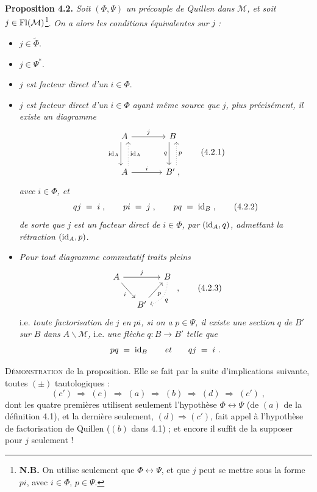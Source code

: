 \textbf{Proposition 4.2.} \textit{Soit} $(\Phi,\Psi)$ \textit{un précouple de Quillen dans} $\mathcal{M}$\textit{, et soit} $j\in\mathrm{Fl}(\mathcal{M})$\footnote[9]{\textbf{N.B.} On utilise seulement que $\Phi\longleftrightarrow\Psi$, et que $j$ peut se mettre sous la forme $pi$, avec $i\in\Phi$, $p\in\Psi$.}. %
\textit{On a alors les conditions équivalentes sur} $j$ \textit{:}
\begin{itemize}[leftmargin=2.5em]
\item[a)] $j\in\widetilde{\Phi}$.
\item[b)] $j\in\Psi^*$.
\item[c)] $j$ \textit{est facteur direct d'un} $i\in\Phi$.
\item[c$'$)] $j$ \textit{est facteur direct d'un} $i\in\Phi$ \textit{ayant même source que} $j$\textit{, plus précisément, il existe un diagramme}
\[
\begin{tikzcd}[row sep=large, column sep=large]
A \arrow[r, "j"] \arrow[d, shift right=1ex, "\id_A"'] & B \arrow[d, shift right=1ex, "q"'] \\
A \arrow[u, dotted, shift right=1ex, "\id_A"'] \arrow[r, "i"] & B' \;, \arrow[u, dotted, shift right=1ex, "p"']
\end{tikzcd}
\tag*{(4.2.1)}
\]
\textit{avec} $i\in\Phi$\textit{, et}
\[
qj \;=\; i\;, \qquad pi \;=\; j\;, \qquad pq \;=\; \mathrm{id}_B\;,
\tag*{(4.2.2)}
\]
\textit{de sorte que} $j$ \textit{est un facteur direct de} $i\in\Phi$\textit{, par} $(\mathrm{id}_A,q)$\textit{, admettant la rétraction} $(\mathrm{id}_A,p)$.
\item[d)] \textit{Pour tout diagramme commutatif traits pleins}
\[
\begin{tikzcd}[column sep=small]
A \arrow[rr, "j"] \arrow[dr, "i"'] & & B \arrow[dl, dotted, bend left=40, "q"] \\
& B' \arrow[ur, "p"'] &
\end{tikzcd}
\;,
\tag*{(4.2.3)}
\]
i.e. \textit{toute factorisation de} $j$ \textit{en} $pi$\textit{, si on a} $p\in\Psi$\textit{, il existe une section} $q$ \textit{de} $B'$ \textit{sur} $B$ \textit{dans} $A\backslash\mathcal{M}$\textit{,} i.e. \textit{une flèche} $q:B\longrightarrow B'$ \textit{telle que}
\[
pq \;=\; \mathrm{id}_B \qquad \textit{et} \qquad qj \;=\; i\ .
\]
\end{itemize}

\textsc{Démonstration} de la proposition. Elle se fait par la suite d'implications suivante, toutes $(\pm)$ tautologiques :
\[
(c') \;\Longrightarrow\; (c) \;\Longrightarrow\; (a) \;\Longrightarrow\; (b) \;\Longrightarrow\; (d) \;\Longrightarrow\; (c')\;,
\]
dont les quatre premières utilisent seulement l'hypothèse $\Phi\longleftrightarrow\Psi$ (de $(a)$ de la définition 4.1), et la dernière seulement, $(d)\Longrightarrow(c')$, fait appel à l'hypothèse de factorisation de Quillen ($(b)$ dans 4.1) ; et encore il suffit de la supposer pour $j$ seulement !

